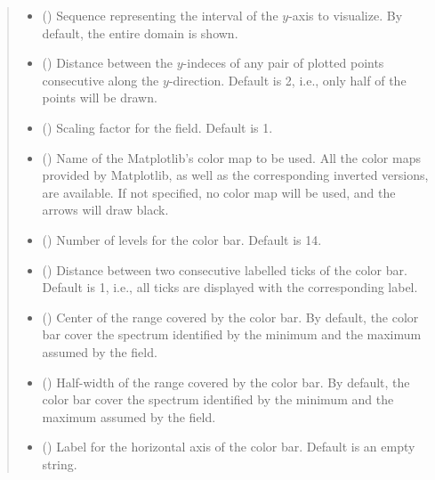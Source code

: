 \documentclass[letterpaper,10pt,english]{sphinxmanual}
\begin{document}
\begin{fulllineitems}
\begin{quote}
\begin{description}
\begin{itemize}
\item {} 
 () \textendash{} Sequence representing the interval of the \(y\)-axis to visualize. By default, the entire domain is shown.

\item {} 
 () \textendash{} Distance between the \(y\)-indeces of any pair of plotted points consecutive along the \(y\)-direction.
Default is 2, i.e., only half of the points will be drawn.

\item {} 
 () \textendash{} Scaling factor for the field. Default is 1.

\item {} 
 () \textendash{} Name of the Matplotlib’s color map to be used. All the color maps provided by Matplotlib, as well as the corresponding inverted
versions, are available. If not specified, no color map will be used, and the arrows will draw black.

\item {} 
 () \textendash{} Number of levels for the color bar. Default is 14.

\item {} 
 () \textendash{} Distance between two consecutive labelled ticks of the color bar. Default is 1, i.e., all ticks are displayed with the
corresponding label.

\item {} 
 () \textendash{} Center of the range covered by the color bar. By default, the color bar cover the spectrum identified by the minimum
and the maximum assumed by the field.

\item {} 
 () \textendash{} Half-width of the range covered by the color bar. By default, the color bar cover the spectrum identified by the minimum
and the maximum assumed by the field.

\item {} 
 () \textendash{} Label for the horizontal axis of the color bar. Default is an empty string.


\end{itemize}
\end{description}
\end{quote}
\end{fulllineitems}
\end{document}
